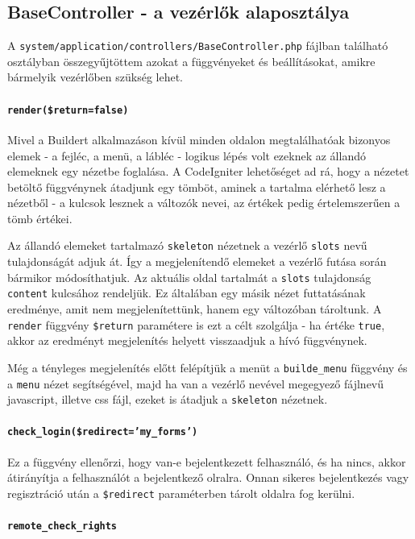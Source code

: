 \documentclass[12pt,a4paper,twoside]{article}
\begin{document}
\subsection{BaseController - a vezérlők alaposztálya}

A \texttt{system/application/controllers/BaseController.php} fájlban található
osztályban összegyűjtöttem azokat a függvényeket és beállításokat, amikre
bármelyik vezérlőben szükség lehet.

\paragraph{\texttt{render(\$return=false)}}
Mivel a Buildert alkalmazáson kívül minden oldalon megtalálhatóak bizonyos
elemek - a fejléc, a menü, a lábléc - logikus lépés volt ezeknek az állandó
elemeknek egy nézetbe foglalása. A CodeIgniter lehetőséget ad rá, hogy a
nézetet betöltő függvénynek átadjunk egy tömböt, aminek a tartalma elérhető lesz
a nézetből - a kulcsok lesznek a változók nevei, az értékek pedig értelemszerűen
a tömb értékei.

Az állandó elemeket tartalmazó \texttt{skeleton} nézetnek a vezérlő
\texttt{slots} nevű tulajdonságát adjuk át. Így a megjelenítendő elemeket a
vezérlő futása során bármikor módosíthatjuk. Az aktuális oldal tartalmát a
\texttt{slots} tulajdonság \texttt{content} kulcsához rendeljük. Ez általában
egy másik nézet futtatásának eredménye, amit nem megjelenítettünk, hanem egy
változóban tároltunk. A \texttt{render} függvény \texttt{\$return} paramétere is
ezt a célt szolgálja - ha értéke \texttt{true}, akkor az eredményt megjelenítés
helyett visszaadjuk a hívó függvénynek.

Még a tényleges megjelenítés előtt felépítjük a menüt a \texttt{builde\_menu}
függvény és a \texttt{menu} nézet segítségével, majd ha van a vezérlő nevével
megegyező fájlnevű javascript, illetve css fájl, ezeket is átadjuk a
\texttt{skeleton} nézetnek.

\paragraph{\texttt{check\_login(\$redirect='my\_forms')}}
Ez a függvény ellenőrzi, hogy van-e bejelentkezett felhasználó, és ha nincs,
akkor átirányítja a felhasználót a bejelentkező olralra. Onnan sikeres
bejelentkezés vagy regisztráció után a \texttt{\$redirect} paraméterben tárolt
oldalra fog kerülni.

\paragraph{\texttt{remote\_check\_rights}}
\label{par:check_rights}
\end{document}
